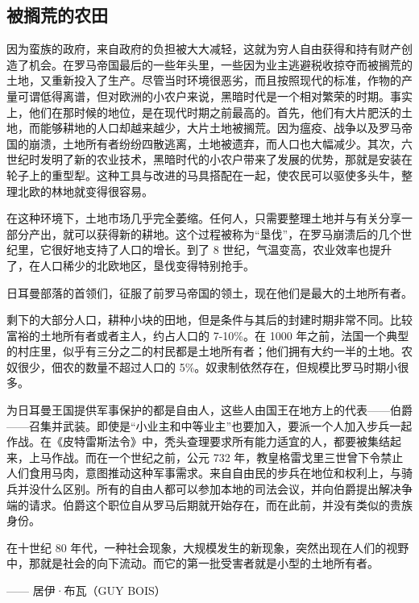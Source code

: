 \subsection{被搁荒的农田}
因为蛮族的政府，来自政府的负担被大大减轻，这就为穷人自由获得和持有财产创造了机会。在罗马帝国最后的一些年头里，一些因为业主逃避税收掠夺而被搁荒的土地，又重新投入了生产。尽管当时环境很恶劣，而且按照现代的标准，作物的产量可谓低得离谱，但对欧洲的小农户来说，黑暗时代是一个相对繁荣的时期。事实上，他们在那时候的地位，是在现代时期之前最高的。首先，他们有大片肥沃的土地，而能够耕地的人口却越来越少，大片土地被搁荒。因为瘟疫、战争以及罗马帝国的崩溃，土地所有者纷纷四散逃离，土地被遗弃，而人口也大幅减少。其次，六世纪时发明了新的农业技术，黑暗时代的小农户带来了发展的优势，那就是安装在轮子上的重型犁。这种工具与改进的马具搭配在一起，使农民可以驱使多头牛，整理北欧的林地就变得很容易。

在这种环境下，土地市场几乎完全萎缩。任何人，只需要整理土地并与有关分享一部分产出，就可以获得新的耕地。这个过程被称为“垦伐”，在罗马崩溃后的几个世纪里，它很好地支持了人口的增长。到了 8 世纪，气温变高，农业效率也提升了，在人口稀少的北欧地区，垦伐变得特别抢手。

日耳曼部落的首领们，征服了前罗马帝国的领土，现在他们是最大的土地所有者。

剩下的大部分人口，耕种小块的田地，但是条件与其后的封建时期非常不同。比较富裕的土地所有者或者主人，约占人口的 7-10\%。在 1000 年之前，法国一个典型的村庄里，似乎有三分之二的村民都是土地所有者；他们拥有大约一半的土地。农奴很少，佃农的数量不超过人口的 5\%。奴隶制依然存在，但规模比罗马时期小很多。

为日耳曼王国提供军事保护的都是自由人，这些人由国王在地方上的代表——伯爵——召集并武装。即使是“小业主和中等业主”也要加入，要派一个人加入步兵一起作战。在《皮特雷斯法令》中，秃头查理要求所有能力适宜的人，都要被集结起来，上马作战。而在一个世纪之前，公元 732 年，教皇格雷戈里三世曾下令禁止人们食用马肉，意图推动这种军事需求。来自自由民的步兵在地位和权利上，与骑兵并没什么区别。所有的自由人都可以参加本地的司法会议，并向伯爵提出解决争端的请求。伯爵这个职位自从罗马后期就开始存在，而在此前，并没有类似的贵族身份。


\begin{tcolorbox}
在十世纪 80 年代，一种社会现象，大规模发生的新现象，突然出现在人们的视野中，那就是社会的向下流动。而它的第一批受害者就是小型的土地所有者。
\begin{flushright}
—— 居伊·布瓦（GUY BOIS）
\end{flushright}
\end{tcolorbox}

